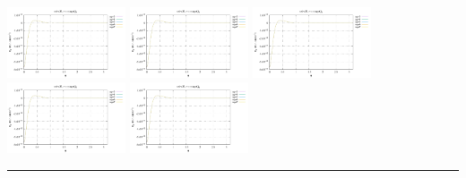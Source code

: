 \noindent
\includegraphics[width=3.5cm]{python_codes/fieldstone_152/RESULTS/exp2/err_64_m2}
\includegraphics[width=3.5cm]{python_codes/fieldstone_152/RESULTS/exp2/err_64_m3}
\includegraphics[width=3.5cm]{python_codes/fieldstone_152/RESULTS/exp2/err_64_m4}
\includegraphics[width=3.5cm]{python_codes/fieldstone_152/RESULTS/exp2/err_64_m5}
\includegraphics[width=3.5cm]{python_codes/fieldstone_152/RESULTS/exp2/err_64_m6}

\hrule

